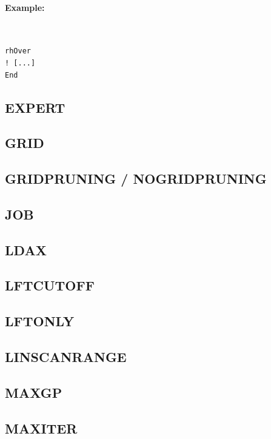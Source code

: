 \documentclass[11pt]{article}
\begin{document}
\paragraph{Example:}~ 

\begin{lstlisting}[frame=single]
rhOver
! [...]
End
\end{lstlisting}

\clearpage
\subsection{EXPERT}

\clearpage
\subsection{GRID}

\clearpage
\subsection{GRIDPRUNING / NOGRIDPRUNING}

\clearpage
\subsection{JOB}

\clearpage
\subsection{LDAX}

\clearpage
\subsection{LFTCUTOFF}

\clearpage
\subsection{LFTONLY}

\clearpage
\subsection{LINSCANRANGE}

\clearpage
\subsection{MAXGP}

\clearpage
\subsection{MAXITER}
\end{document}
